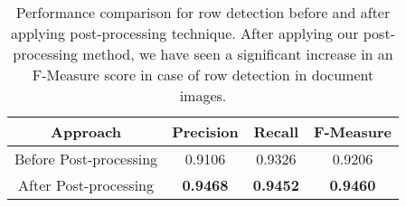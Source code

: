 \documentclass{ieeeaccess}
\begin{document}
\begin{table}
    \centering
    \normalsize
    \setlength\tabcolsep{5pt} 
    \setlength\extrarowheight{5pt}
\begin{tabular}{ |c|c|c|c| } 
    \hline
    \normalsize {Approach} &
    \normalsize  {Precision}&
    \normalsize  {Recall}&
    \normalsize  {F-Measure} \\
    \hline
    \small {Before Post-processing} &
    \small  {0.9106}&
    \small  {0.9326}&
    \small {0.9206} \\
    \hline
    \small {After Post-processing} &
    \small  \textbf{{0.9468}}&
    \small  \textbf{{0.9452}}&
    \small \textbf{{0.9460}} \\
    \hline
\end{tabular}
    \caption{Performance comparison for row detection before and after applying post-processing technique. After applying our post-processing method, we have seen a significant increase in an F-Measure score in case of row detection in document images.}
    \label{tab:post_process_results}
\end{table}




\newcolumntype{d}{X}
\end{document}
